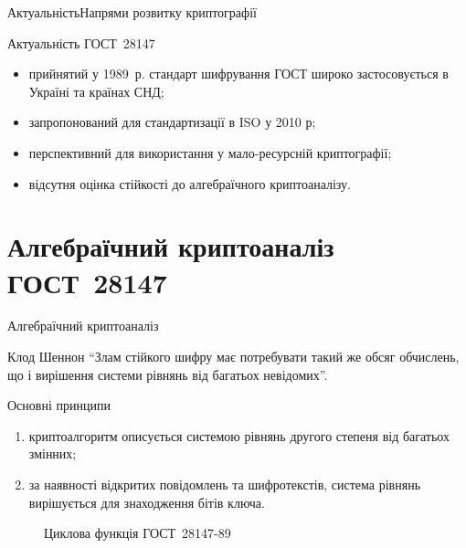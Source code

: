 \documentclass[10pt, ucs]{beamer}
\begin{document}
\begin{frame}[shrink=1.2]{Актуальність}{Напрями розвитку криптографії}
    \footnotesize
    \begin{block}{Актуальність ГОСТ~28147}
        \begin{itemize}
            \item прийнятий у 1989~р. стандарт шифрування ГОСТ широко
                застосовується в Україні та країнах СНД;
            \item запропонований для стандартизації в ISO у 2010 р;
            \item перспективний для використання у мало-ресурсній криптографії;
            \item відсутня оцінка стійкості до алгебраїчного криптоаналізу.
        \end{itemize}
    \end{block}
\end{frame}


\section{Алгебраїчний криптоаналіз  ГОСТ~28147}
\begin{frame}{Алгебраїчний криптоаналіз}
    \begin{block}{Клод Шеннон}
        ``Злам стійкого шифру має потребувати такий же обсяг обчислень, що і
        вирішення системи рівнянь від багатьох невідомих''.
    \end{block}
    \begin{minipage}[t]{0.5\textwidth}
        \begin{block}{Основні принципи}
            \begin{enumerate}
                \item криптоалгоритм описується системою рівнянь другого
                    степеня від багатьох змінних;
                \item за наявності відкритих повідомлень та шифротекстів,
                    система рівнянь вирішується для знаходження бітів ключа.
            \end{enumerate}
        \end{block}
    \end{minipage}%
    \hspace*{1ex}
    \begin{minipage}[t]{0.5\textwidth}
        \begin{figure}[htbp]
            \centering
            
            \caption{Циклова функція ГОСТ~28147-89}
        \end{figure}
    \end{minipage}%
\end{frame}
\end{document}

